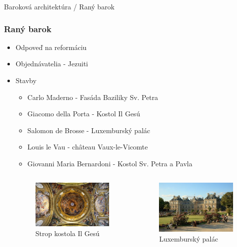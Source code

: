 \documentclass[dvipsnames]{beamer}
\begin{document}
\begin{frame}{\small \textcolor{g}{Baroková architektúra} / \Large Raný barok}
	\subsubsection{Raný barok}
	\begin{itemize}
		\item Odpoveď na reformáciu
		\item Objednávatelia - Jezuiti
		\item Stavby
		\begin{itemize}
			\item \textcolor{BurntOrange}{Carlo Maderno} - Fasáda Baziliky Sv. Petra
				\item \textcolor{BurntOrange}{Giacomo della Porta} - Kostol Il Gesú
				\item \textcolor{BurntOrange}{Salomon de Brosse} - Luxemburský palác
				\item \textcolor{BurntOrange}{Louis le Vau} - château Vaux-le-Vicomte
				\item \textcolor{BurntOrange}{Giovanni Maria Bernardoni} - Kostol Sv. Petra a Pavla
		\end{itemize}
		\begin{columns}
			\kern0pt
			\begin{figure}
				\includegraphics[scale=0.5]{gesu}
				\caption{Strop kostola Il Gesú}
			\end{figure}%
			\begin{figure}
				\includegraphics[scale=3.5]{lux}
				\caption{Luxemburský palác}
			\end{figure}
		\end{columns}
	\end{itemize}
\end{frame}
\end{document}
